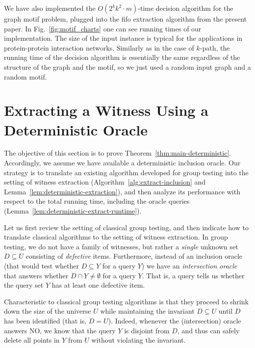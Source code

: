\documentclass[11pt]{article}
\begin{document}
We have also implemented the $O(2^kk^2\cdot m)$-time decision algorithm \cite{BjorklundKaskiKowalik2013} for the graph motif problem, plugged into the fifo extraction algorithm from the present paper.
In Fig.~\ref{fig:motif_charts} one can see running times of our implementation.
The size of the input instance is typical for the applications in protein-protein interaction networks.
Similarly as in the case of $k$-path, the running time of the decision algorithm is essentially the same regardless of the structure of the graph and the motif, so we just used a random input graph and a random motif.

\section{Extracting a Witness Using a Deterministic Oracle}
\label{sect:deterministic}

The objective of this section is to prove Theorem~\ref{thm:main-deterministic}. Accordingly, we assume we have available a deterministic inclusion oracle. Our strategy is to translate an existing algorithm developed for group testing into the setting of witness extraction (Algorithm~\ref{alg:extract-inclusion} and Lemma~\ref{lem:deterministic-extraction}), and then analyze its performance with respect to the total running time, including the oracle queries (Lemma~\ref{lem:deterministic-extract-runtime}).

Let us first review the setting of classical group testing, and then indicate how to translate classical algorithms to the setting of witness extraction. In group testing, we do not have a family of witnesses, but rather a {\em single} unknown set $D\subseteq U$ consisting of {\em defective} items. Furthermore, instead of an inclusion oracle (that would test whether $D\subseteq Y$ for a query $Y$) we have an {\em intersection oracle} that answers whether $D\cap Y\neq\emptyset$ for a query $Y$. That is, a query tells us whether the query set $Y$ has at least one defective item.

Characteristic to classical group testing algorithms is that they proceed to shrink down the size of the universe $U$ while maintaining the invariant $D\subseteq U$ until $D$ has been identified (that is, $D=U$). Indeed, whenever the (intersection) oracle answers NO, we know that the query $Y$ is disjoint from $D$, and thus can safely delete all points in $Y$ from $U$ without violating the invariant. 
\end{document}
